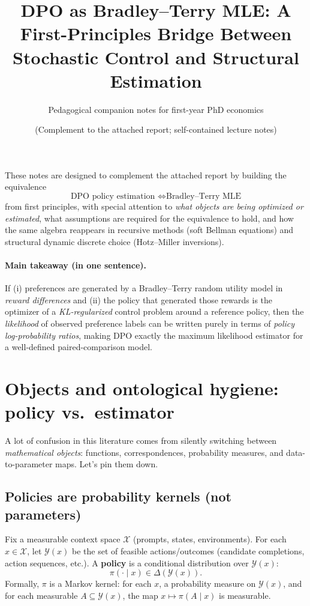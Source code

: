 \documentclass[11pt]{article}
\title{\vspace{-1.0em}\textbf{DPO as Bradley--Terry MLE: A First-Principles Bridge Between\\
Stochastic Control and Structural Estimation}}
\author{Pedagogical companion notes for first-year PhD economics}
\date{(Complement to the attached report; self-contained lecture notes)}
\newcommand{\1}{\mathbf{1}}
\theoremstyle{plain}
\theoremstyle{definition}
\theoremstyle{remark}
\begin{document}
\maketitle
\vspace{-1.0em}

\begin{tcolorbox}[colback=light, colframe=accent, title=What this document is for]
These notes are designed to complement the attached report by building the equivalence
\[
\text{DPO policy estimation } \Longleftrightarrow \text{Bradley--Terry MLE}
\]
from first principles, with special attention to \emph{what objects are being optimized or estimated},
what assumptions are required for the equivalence to hold, and how the same algebra reappears in
recursive methods (soft Bellman equations) and structural dynamic discrete choice (Hotz--Miller inversions).
\end{tcolorbox}

\paragraph{Main takeaway (in one sentence).}
If (i) preferences are generated by a Bradley--Terry random utility model in \emph{reward differences} and
(ii) the policy that generated those rewards is the optimizer of a \emph{KL-regularized} control problem
around a reference policy, then the \emph{likelihood} of observed preference labels can be written purely
in terms of \emph{policy log-probability ratios}, making DPO exactly the maximum likelihood estimator
for a well-defined paired-comparison model.

\tableofcontents

\section{Objects and ontological hygiene: policy vs.\ estimator}
A lot of confusion in this literature comes from silently switching between \emph{mathematical objects}:
functions, correspondences, probability measures, and data-to-parameter maps. Let's pin them down.

\subsection{Policies are probability kernels (not parameters)}
Fix a measurable context space $\mathcal{X}$ (prompts, states, environments). For each $x\in\mathcal{X}$,
let $\mathcal{Y}(x)$ be the set of feasible actions/outcomes (candidate completions, action sequences, etc.).
A \textbf{policy} is a conditional distribution over $\mathcal{Y}(x)$:
\[
\pi(\cdot\mid x)\in \Delta(\mathcal{Y}(x)).
\]
Formally, $\pi$ is a Markov kernel: for each $x$, a probability measure on $\mathcal{Y}(x)$, and for each measurable $A\subseteq \mathcal{Y}(x)$, the map $x\mapsto \pi(A\mid x)$ is measurable.
\end{document}
